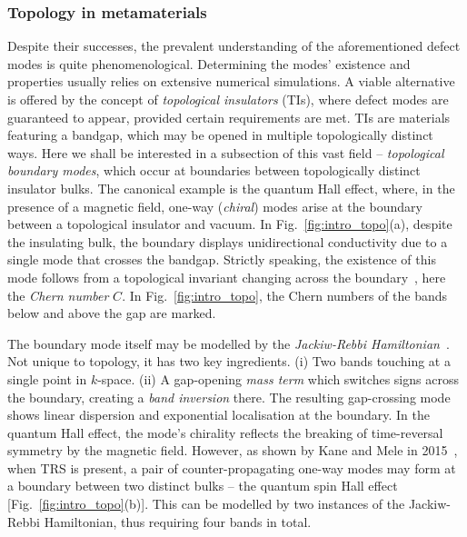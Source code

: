 \subsubsection{Topology in metamaterials}

Despite their successes, the prevalent understanding of the aforementioned defect modes is quite phenomenological. Determining the modes' existence and properties usually relies on extensive numerical simulations. A viable alternative is offered by the concept of \textit{topological insulators} (TIs), where defect modes are guaranteed to appear, provided certain requirements are met. TIs are materials featuring a bandgap, which may be opened in multiple topologically distinct ways. Here we shall be interested in a subsection of this vast field -- \textit{topological boundary modes}, which occur at boundaries between topologically distinct insulator bulks. The canonical example is the quantum Hall effect, where, in the presence of a magnetic field, one-way (\textit{chiral}) modes arise at the boundary between a topological insulator and vacuum. In Fig.~\ref{fig:intro_topo}(a), despite the insulating bulk, the boundary displays unidirectional conductivity due to a single mode that crosses the bandgap. Strictly speaking, the existence of this mode follows from a topological invariant changing across the boundary~\cite{Bernevig_2013}, here the \textit{Chern number} $C$. In Fig.~\ref{fig:intro_topo}, the Chern numbers of the bands below and above the gap are marked.

The boundary mode itself may be modelled by the \textit{Jackiw-Rebbi Hamiltonian}~\cite{Jackiw_1976}. Not unique to topology, it has two key ingredients. (i) Two bands touching at a single point in $k$-space. (ii) A gap-opening \textit{mass term} which switches signs across the boundary, creating a \textit{band inversion} there. The resulting gap-crossing mode shows linear dispersion and exponential localisation at the boundary. In the quantum Hall effect, the mode's chirality reflects the breaking of time-reversal symmetry by the magnetic field. However, as shown by Kane and Mele in 2015~\cite{Kane_Mele_2005}, when TRS is present, a pair of counter-propagating one-way modes may form at a boundary between two distinct bulks -- the quantum spin Hall effect [Fig.~\ref{fig:intro_topo}(b)]. This can be modelled by two instances of the Jackiw-Rebbi Hamiltonian, thus requiring four bands in total.

